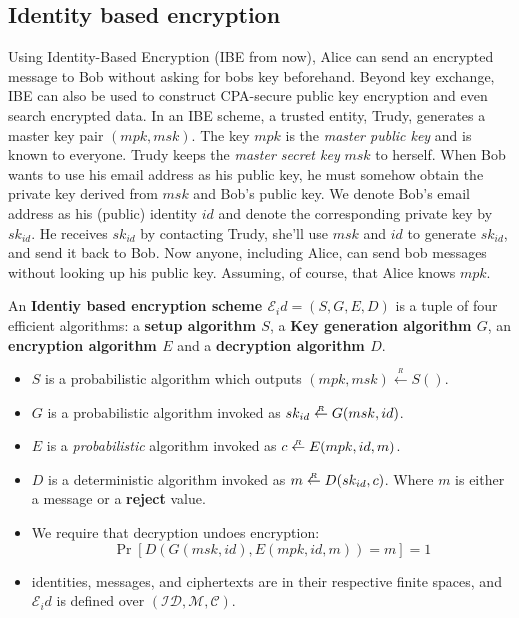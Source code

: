 \subsection{Identity based encryption}
Using Identity-Based Encryption (IBE from now), Alice can send an encrypted message to Bob
without asking for bobs key beforehand. Beyond key exchange, IBE can also 
be used to construct CPA-secure public key encryption and even search encrypted data.
In an IBE scheme, a trusted entity, Trudy, generates a master key pair $(mpk, msk)$.
The key $mpk$ is the \emph{master public key} and is known to everyone. Trudy keeps the \emph{master 
secret key} $msk$ to herself. When Bob wants to use his email address as his public key, he must
somehow obtain the private key derived from $msk$ and Bob's public key.
We denote Bob's email address as his (public) identity $id$ and denote the corresponding private key 
by $sk_{id}$. He receives $sk_{id}$ by contacting Trudy, she'll use $msk$ and $id$ to generate $sk_{id}$,
and send it back to Bob.
Now anyone, including Alice, can send bob messages without looking up his public key. 
Assuming, of course, that Alice knows $mpk$.

\begin{defn}
  An \textbf{Identiy based encryption scheme $ \mathcal{E}_id =(S,G,E,D)$}
  is a tuple of four efficient algorithms: a \textbf{setup algorithm $S$}, a 
  \textbf{Key generation algorithm $G$}, an \textbf{encryption algorithm $E$}
  and a \textbf{decryption algorithm $D$}.

  \begin{itemize}
    \item $S$ is a probabilistic algorithm which outputs $(mpk, msk) \overset{_R}{\leftarrow} S()$.
    \item $G$ is a probabilistic algorithm invoked as $sk_{id} \overset{_R}{\leftarrow} G(msk, id)$.
    \item $E$ is a \emph{probabilistic} algorithm invoked as $c \overset{_R}{\leftarrow} E(mpk, id, m)$.
    \item $D$ is a deterministic algorithm invoked as $m\overset{_R}{\leftarrow} D(sk_{id},c)$. Where $m$ is
      either a message or a \textbf{reject} value.
    \item We require that decryption undoes encryption: 
    $$ \Pr[D(G(msk,id), E(mpk,id,m))=m]=1$$
    \item identities, messages, and ciphertexts are in their respective finite spaces,
    and $\mathcal{E}_id$ is defined over $(\mathcal{ID},\mathcal{M},\mathcal{C})$.
  \end{itemize}
\end{defn}

